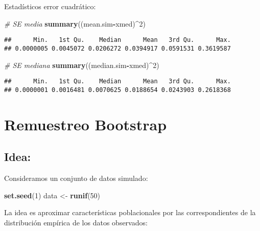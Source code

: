 \documentclass[
]{book}
\newenvironment{Shaded}{\begin{snugshade}}{\end{snugshade}}
\newcommand{\CommentTok}[1]{\textcolor[rgb]{0.56,0.35,0.01}{\textit{#1}}}
\newcommand{\DecValTok}[1]{\textcolor[rgb]{0.00,0.00,0.81}{#1}}
\newcommand{\KeywordTok}[1]{\textcolor[rgb]{0.13,0.29,0.53}{\textbf{#1}}}
\newcommand{\NormalTok}[1]{#1}
\newcommand{\OperatorTok}[1]{\textcolor[rgb]{0.81,0.36,0.00}{\textbf{#1}}}
\newcommand{\StringTok}[1]{\textcolor[rgb]{0.31,0.60,0.02}{#1}}
\theoremstyle{break}
\theoremstyle{definition}
\theoremstyle{definition}
\theoremstyle{definition}
\theoremstyle{remark}
\begin{document}
\begin{enumerate}
  Estadísticos error cuadrático:

\begin{Shaded}
\begin{Highlighting}[]
\CommentTok{# SE media}
\KeywordTok{summary}\NormalTok{((mean.sim}\OperatorTok{-}\NormalTok{xmed)}\OperatorTok{^}\DecValTok{2}\NormalTok{) }
\end{Highlighting}
\end{Shaded}

\begin{verbatim}
##      Min.   1st Qu.    Median      Mean   3rd Qu.      Max. 
## 0.0000005 0.0045072 0.0206272 0.0394917 0.0591531 0.3619587
\end{verbatim}

\begin{Shaded}
\begin{Highlighting}[]
\CommentTok{# SE mediana}
\KeywordTok{summary}\NormalTok{((median.sim}\OperatorTok{-}\NormalTok{xmed)}\OperatorTok{^}\DecValTok{2}\NormalTok{) }
\end{Highlighting}
\end{Shaded}

\begin{verbatim}
##      Min.   1st Qu.    Median      Mean   3rd Qu.      Max. 
## 0.0000001 0.0016481 0.0070625 0.0188654 0.0243903 0.2618368
\end{verbatim}
\end{enumerate}

\hypertarget{remuestreo-bootstrap}{%
\section{Remuestreo Bootstrap}\label{remuestreo-bootstrap}}

\hypertarget{idea}{%
\subsection{Idea:}\label{idea}}

Consideramos un conjunto de datos simulado:

\begin{Shaded}
\begin{Highlighting}[]
\KeywordTok{set.seed}\NormalTok{(}\DecValTok{1}\NormalTok{)}
\NormalTok{data <-}\StringTok{ }\KeywordTok{runif}\NormalTok{(}\DecValTok{50}\NormalTok{)}
\end{Highlighting}
\end{Shaded}

La idea es aproximar características poblacionales por las correspondientes de la distribución empírica de los datos observados:
\end{document}
